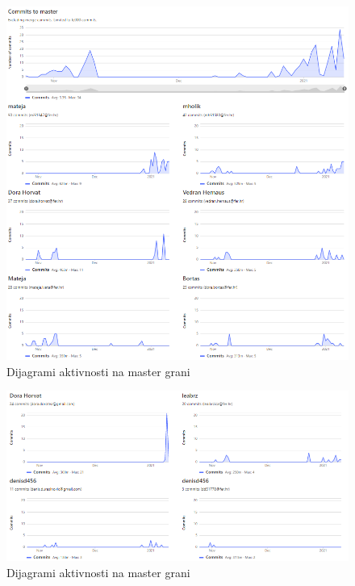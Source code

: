 		\begin{figure}[H]
			\includegraphics[scale=0.7]{slike/gitlab1.png} %
			\centering
			\caption{Dijagrami aktivnosti na master grani}
			\label{fig:aktivnost1}
		\end{figure}
	
		\begin{figure}[H]
			\includegraphics[scale=0.7]{slike/gitlab2.png} %
			\centering
			\caption{Dijagrami aktivnosti na master grani}
			\label{fig:aktivnost2}
		\end{figure}
		
